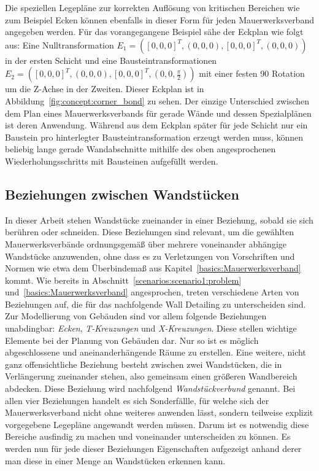 Die speziellen Legepläne zur korrekten Auflösung von kritischen Bereichen wie zum Beispiel Ecken können ebenfalls in dieser Form für jeden Mauerwerksverband angegeben werden.
Für das vorangegangene Beispiel sähe der Eckplan wie folgt aus:
Eine Nulltransformation \(E_1 = ({[0, 0, 0]}^T, (0, 0, 0), {[0, 0, 0]}^T, (0, 0, 0))\) in der ersten Schicht und eine Bausteintransformationen 
\(E_2 = ({[0, 0, 0]}^T, (0, 0, 0), {[0, 0, 0]}^T, (0, 0, \frac{\pi}{2}))\) mit einer festen 90\degree{} Rotation um die Z-Achse in der Zweiten.
Dieser Eckplan ist in Abbildung~\ref{fig:concept:corner_bond} zu sehen.
Der einzige Unterschied zwischen dem Plan eines Mauerwerksverbands für gerade Wände und dessen Spezialplänen ist deren Anwendung.
Während aus dem Eckplan später für jede Schicht nur ein Baustein pro hinterlegter Bausteintransformation erzeugt werden muss, können beliebig lange gerade Wandabschnitte mithilfe des oben angesprochenen Wiederholungsschritts mit Bausteinen aufgefüllt werden.

\subsection{Beziehungen zwischen Wandstücken}\label{concept:relations_wandtuecke}
In dieser Arbeit stehen Wandstücke zueinander in einer Beziehung, sobald sie sich berühren oder schneiden.
Diese Beziehungen sind relevant, um die gewählten Mauerwerksverbände ordnungsgemäß über mehrere voneinander abhängige Wandstücke anzuwenden, ohne dass es zu Verletzungen von Vorschriften und Normen wie etwa dem Überbindemaß aus Kapitel~\ref{basics:Mauerwerksverband} kommt.
Wie bereits in Abschnitt~\ref{scenarios:scenario1:problem} und~\ref{basics:Mauerwerksverband} angesprochen, treten verschiedene Arten von Beziehungen auf, die für das nachfolgende \glqq{}Wall Detailing\grqq{} zu unterscheiden sind.
Zur Modellierung von Gebäuden sind vor allem folgende Beziehungen unabdingbar:
\textit{Ecken}, \textit{T-Kreuzungen} und \textit{X-Kreuzungen}.
Diese stellen wichtige Elemente bei der Planung von Gebäuden dar. 
Nur so ist es möglich abgeschlossene und aneinanderhängende Räume zu erstellen.
Eine weitere, nicht ganz offensichtliche Beziehung besteht zwischen zwei Wandstücken, die in Verlängerung zueinander stehen, also gemeinsam einen größeren Wandbereich abdecken.
Diese Beziehung wird nachfolgend \textit{Wandstückverbund} genannt.
Bei allen vier Beziehungen handelt es sich Sonderfällle, für welche sich der Mauerwerksverband nicht ohne weiteres anwenden lässt, sondern teilweise explizit vorgegebene Legepläne angewandt werden müssen.
Darum ist es notwendig diese Bereiche ausfindig zu machen und voneinander unterscheiden zu können.
Es werden nun für jede dieser Beziehungen Eigenschaften aufgezeigt anhand derer man diese in einer Menge an Wandstücken erkennen kann.

